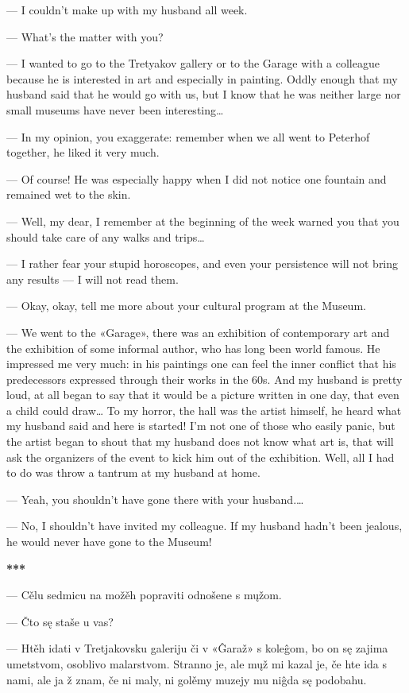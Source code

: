 — I couldn’t make up with my husband all week.

— What’s the matter with you?

— I wanted to go to the Tretyakov gallery or to the Garage with a colleague because he is interested in art and especially in painting. Oddly enough that my husband said that he would go with us, but I know that he was neither large nor small museums have never been interesting…

— In my opinion, you exaggerate: remember when we all went to Peterhof together, he liked it very much.

— Of course! He was especially happy when I did not notice one fountain and remained wet to the skin.

— Well, my dear, I remember at the beginning of the week warned you that you should take care of any walks and trips…

— I rather fear your stupid horoscopes, and even your persistence will not bring any results — I will not read them.

— Okay, okay, tell me more about your cultural program at the Museum.

— We went to the «Garage», there was an exhibition of contemporary art and the exhibition of some informal author, who has long been world famous. He impressed me very much: in his paintings one can feel the inner conflict that his predecessors expressed through their works in the 60s. And my husband is pretty loud, at all began to say that it would be a picture written in one day, that even a child could draw… To my horror, the hall was the artist himself, he heard what my husband said and here is started! I’m not one of those who easily panic, but the artist began to shout that my husband does not know what art is, that will ask the organizers of the event to kick him out of the exhibition. Well, all I had to do was throw a tantrum at my husband at home.

— Yeah, you shouldn’t have gone there with your husband.…

— No, I shouldn’t have invited my colleague. If my husband hadn’t been jealous, he would never have gone to the Museum!

\begin{center}
	\textbf{***}
\end{center}

— Cělu sedmicu na možěh popraviti odnošene s mųžom.

— Čto sę staše u vas?

— Htěh idati v Tretjakovsku galeriju či v «Ĝaraž» s koleĝom, bo on sę zajima umetstvom, osoblivo malarstvom. Stranno je, ale mųž mi kazal je, če hte ida s nami, ale ja ž znam, če ni maly, ni golěmy muzejy mu niĝda sę podobahu.

